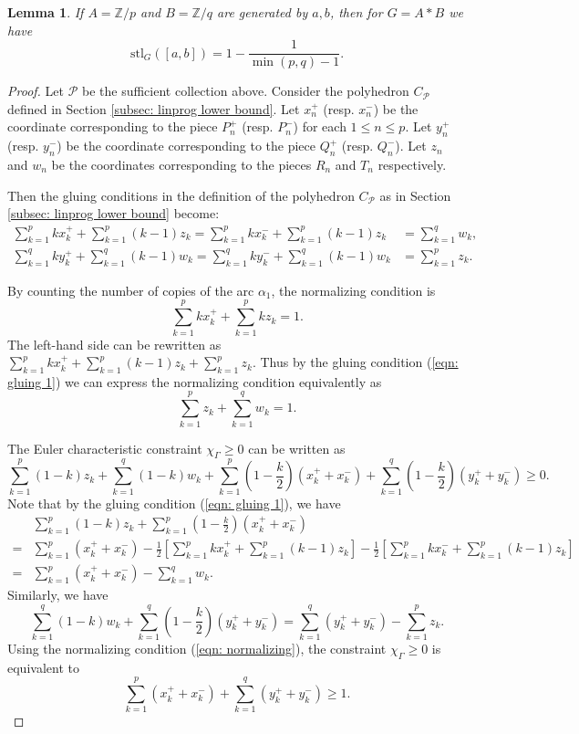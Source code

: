 \documentclass{amsart}
\newtheorem{lemma}[theorem]{Lemma}
\theoremstyle{definition}
\numberwithin{equation}{section}
\theoremstyle{theorem}
\theoremstyle{remark}
\def\Z{\mathbb Z}
\def\stl{\mathrm{stl}}
\begin{document}
	\begin{lemma}\label{lemma: compute abAB}
		If $A=\Z/p$ and $B=\Z/q$ are generated by $a,b$, then for $G=A*B$ we have
		$$\stl_G([a,b])=1-\frac{1}{\min(p,q)-1}.$$
	\end{lemma}
	\begin{proof}
		Let $\mathcal{P}$ be the sufficient collection above. Consider the polyhedron $C_{\mathcal{P}}$ defined in Section \ref{subsec: linprog lower bound}.
		Let $x_n^+$ (resp. $x_n^-$) be the coordinate corresponding to the piece $P_n^+$ (resp. $P_n^-$) for each $1\le n\le p$. Let $y_n^+$ (resp. $y_n^-$) be the coordinate corresponding to the piece $Q_n^+$ (resp. $Q_n^-$). Let $z_n$ and $w_n$ be the coordinates corresponding to the pieces $R_n$ and $T_n$ respectively.
		
		Then the gluing conditions in the definition of the polyhedron $C_{\mathcal{P}}$ as in Section \ref{subsec: linprog lower bound} become:
		\begin{align}
			\sum_{k=1}^p k x_k^+ + \sum_{k=1}^p (k-1) z_k = \sum_{k=1}^p k x_k^- + \sum_{k=1}^p (k-1) z_k &= \sum_{k=1}^q w_k, \label{eqn: gluing 1}\\
			\sum_{k=1}^q k y_k^+ + \sum_{k=1}^q (k-1) w_k = \sum_{k=1}^q k y_k^- + \sum_{k=1}^q (k-1) w_k &= \sum_{k=1}^p z_k. \label{eqn: gluing 2}
		\end{align}
		
		By counting the number of copies of the arc $\alpha_1$, the normalizing condition is
		$$\sum_{k=1}^p k x_k^+ + \sum_{k=1}^p k z_k=1.$$
		The left-hand side can be rewritten as $\sum_{k=1}^p k x_k^+ + \sum_{k=1}^p (k-1) z_k + \sum_{k=1}^p z_k$. 
		Thus by the gluing condition (\ref{eqn: gluing 1}) we can express the normalizing condition equivalently as
		\begin{equation}\label{eqn: normalizing}
		    \sum_{k=1}^p z_k+\sum_{k=1}^q w_k=1.    
		\end{equation}
		
		The Euler characteristic constraint $\chi_\Gamma\ge0$ can be written as
		$$\sum_{k=1}^p (1-k) z_k+\sum_{k=1}^q (1-k) w_k+\sum_{k=1}^p (1-\frac{k}{2})(x_k^+ + x_k^-)+\sum_{k=1}^q (1-\frac{k}{2})(y_k^+ + y_k^-)\ge0.$$
		Note that by the gluing condition (\ref{eqn: gluing 1}), we have
		\begin{align*}
		    &\sum_{k=1}^p (1-k) z_k + \sum_{k=1}^p (1-\frac{k}{2})(x_k^+ + x_k^-)\\
		=&\sum_{k=1}^p (x_k^+ + x_k^-) -\frac{1}{2}\left[\sum_{k=1}^p k x_k^+ + \sum_{k=1}^p (k-1) z_k\right] -\frac{1}{2}\left[\sum_{k=1}^p k x_k^- + \sum_{k=1}^p (k-1) z_k\right]\\
		=&\sum_{k=1}^p (x_k^+ + x_k^-) - \sum_{k=1}^q w_k.
		\end{align*}
		Similarly, we have
		$$\sum_{k=1}^q (1-k) w_k+\sum_{k=1}^q (1-\frac{k}{2})(y_k^+ + y_k^-)=\sum_{k=1}^q (y_k^+ + y_k^-) - \sum_{k=1}^p z_k.$$
		Using the normalizing condition (\ref{eqn: normalizing}), the constraint $\chi_\Gamma\ge0$ is equivalent to
		\begin{equation}\label{eqn: chigamma_ineq}
		    \sum_{k=1}^p (x_k^+ + x_k^-) + \sum_{k=1}^q (y_k^+ + y_k^-) \ge 1.
		\end{equation}
		

\end{proof}
\end{document}
